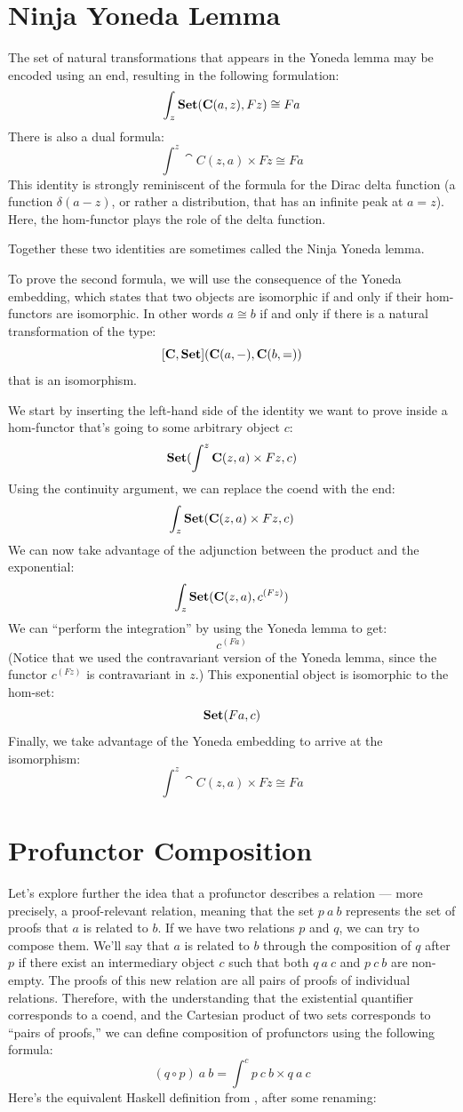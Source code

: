 \section{Ninja Yoneda Lemma}

The set of natural transformations that appears in the Yoneda lemma may
be encoded using an end, resulting in the following formulation:
\[\int_z \mathbf{Set}(\mathbf{C}(a, z), F z) \cong F a\]
There is also a dual formula:
\[\int^z \cat{C}(z, a)\times{}F z \cong F a\]
This identity is strongly reminiscent of the formula for the Dirac delta
function (a function $\delta(a - z)$, or rather a distribution, that
has an infinite peak at $a = z$). Here, the hom-functor plays
the role of the delta function.

Together these two identities are sometimes called the Ninja Yoneda
lemma.

To prove the second formula, we will use the consequence of the Yoneda
embedding, which states that two objects are isomorphic if and only if
their hom-functors are isomorphic. In other words $a \cong b$ if
and only if there is a natural transformation of the type:
\[[\mathbf{C}, \mathbf{Set}](\mathbf{C}(a, -), \mathbf{C}(b, =))\]
that is an isomorphism.

We start by inserting the left-hand side of the identity we want to
prove inside a hom-functor that's going to some arbitrary object
$c$:
\[\mathbf{Set}(\int^z \mathbf{C}(z, a)\times{}F z, c)\]
Using the continuity argument, we can replace the coend with the end:
\[\int_z \mathbf{Set}(\mathbf{C}(z, a)\times{}F z, c)\]
We can now take advantage of the adjunction between the product and the
exponential:
\[\int_z \mathbf{Set}(\mathbf{C}(z, a), c^{(F z)})\]
We can ``perform the integration'' by using the Yoneda lemma to get:
\[c^{(F a)}\]
(Notice that we used the contravariant version of the Yoneda lemma,
since the functor $c^{(F z)}$ is contravariant in $z$.)
This exponential object is isomorphic to the hom-set:
\[\mathbf{Set}(F a, c)\]
Finally, we take advantage of the Yoneda embedding to arrive at the
isomorphism:
\[\int^z \cat{C}(z, a)\times{}F z \cong F a\]

\section{Profunctor Composition}

Let's explore further the idea that a profunctor describes a relation
--- more precisely, a proof-relevant relation, meaning that the set
$p\ a\ b$ represents the set of proofs that $a$ is related
to $b$. If we have two relations $p$ and $q$, we can
try to compose them. We'll say that $a$ is related to $b$
through the composition of $q$ after $p$ if there exist an
intermediary object $c$ such that both $q\ a\ c$ and
$p\ c\ b$ are non-empty. The proofs of this new relation are all
pairs of proofs of individual relations. Therefore, with the
understanding that the existential quantifier corresponds to a coend,
and the Cartesian product of two sets corresponds to ``pairs of
proofs,'' we can define composition of profunctors using the following
formula:
\[(q \circ p)\ a\ b = \int^c p\ c\ b\times{}q\ a\ c\]
Here's the equivalent Haskell definition from
, after some renaming:

